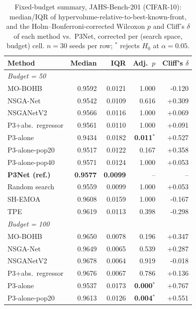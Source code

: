 \begin{table}[t]
    \centering
    \footnotesize
    \caption{Fixed-budget summary, JAHS-Bench-201 (CIFAR-10): median/IQR of hypervolume-relative-to-best-known-front, and the Holm--Bonferroni-corrected Wilcoxon $p$ and Cliff's $\delta$ of each method vs.\ P3Net, corrected per (search space, budget) cell. $n=30$ seeds per row; $^{*}$ rejects $H_0$ at $\alpha=0.05$.}
    \label{tab:fixed-budget-jahs}
    \begin{tabular}{@{}lrrrr@{}}
        \toprule
        \textbf{Method} & \textbf{Median} & \textbf{IQR} & \textbf{Adj.\ $p$} & \textbf{Cliff's $\delta$} \\
        \midrule
        \multicolumn{5}{l}{\emph{Budget = 50}} \\
        MO-BOHB & 0.9592 & 0.0121 & 1.000 & -0.120 \\
        NSGA-Net & 0.9542 & 0.0109 & 0.616 & +0.309 \\
        NSGANetV2 & 0.9566 & 0.0116 & 1.000 & +0.069 \\
        P3+abs.\ regressor & 0.9561 & 0.0110 & 1.000 & +0.091 \\
        P3-alone & 0.9434 & 0.0182 & \textbf{0.011$^{*}$} & +0.527 \\
        P3-alone-pop20 & 0.9517 & 0.0122 & 0.167 & +0.358 \\
        P3-alone-pop40 & 0.9571 & 0.0124 & 1.000 & +0.053 \\
        \textbf{P3Net (ref.)} & \textbf{0.9577} & \textbf{0.0099} & -- & -- \\
        Random search & 0.9559 & 0.0099 & 1.000 & +0.053 \\
        SH-EMOA & 0.9608 & 0.0159 & 1.000 & -0.167 \\
        TPE & 0.9619 & 0.0113 & 0.398 & -0.298 \\
        \midrule
        \multicolumn{5}{l}{\emph{Budget = 100}} \\
        MO-BOHB & 0.9650 & 0.0078 & 0.196 & +0.347 \\
        NSGA-Net & 0.9649 & 0.0065 & 0.539 & +0.287 \\
        NSGANetV2 & 0.9678 & 0.0064 & 0.919 & -0.018 \\
        P3+abs.\ regressor & 0.9676 & 0.0067 & 0.786 & +0.136 \\
        P3-alone & 0.9537 & 0.0173 & \textbf{0.000$^{*}$} & +0.767 \\
        P3-alone-pop20 & 0.9613 & 0.0126 & \textbf{0.004$^{*}$} & +0.551 \\

\end{tabular}
\end{table}
